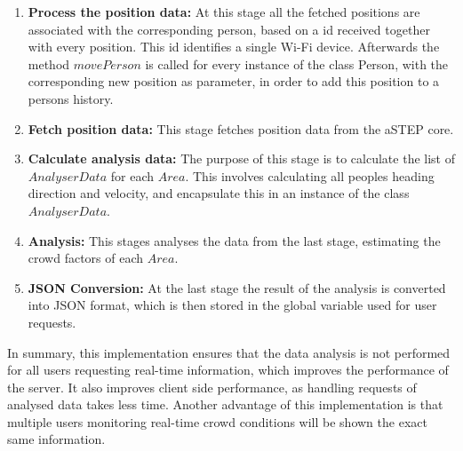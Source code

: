 \begin{enumerate}
    \item \textbf{Process the position data:} At this stage all the fetched positions are associated with the corresponding person, based on a id received together with every position. This id identifies a single Wi-Fi device. Afterwards the method $movePerson$ is called for every instance of the class Person, with the corresponding new position as parameter, in order to add this position to a persons history.
    \item \textbf{Fetch position data:} This stage fetches position data from the aSTEP core.
    \item \textbf{Calculate analysis data:} The purpose of this stage is to calculate the list of $AnalyserData$ for each $Area$. This involves calculating all peoples heading direction and velocity, and encapsulate this in an instance of the class $AnalyserData$.
    \item \textbf{Analysis:} This stages analyses the data from the last stage, estimating the crowd factors of each $Area$.
    \item \textbf{JSON Conversion:} At the last stage the result of the analysis is converted into JSON format, which is then stored in the global variable used for user requests. 
\end{enumerate}

In summary, this implementation ensures that the data analysis is not performed for all users requesting real-time information, which improves the performance of the server. It also improves client side performance, as handling requests of analysed data takes less time. Another advantage of this implementation is that multiple users monitoring real-time crowd conditions will be shown the exact same information.
